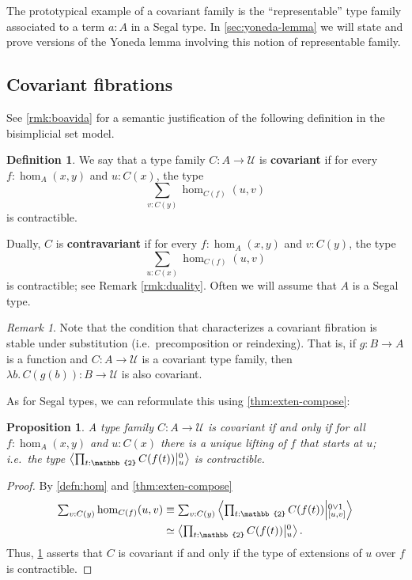 \documentclass{amsart}
\theoremstyle{plain}
\newtheorem{prop}[thm]{Proposition}
\theoremstyle{definition}
\newtheorem{defn}[thm]{Definition}
\theoremstyle{remark}
\newtheorem{rmk}[thm]{Remark}
\numberwithin{equation}{section}
\newcommand{\tsum}{\textstyle\sum}
\newcommand{\exten}[4]{\left\langle\mathchoice{\textstyle\prod_{#1}}{\textstyle\prod_{#1}}{\scriptstyle\prod_{#1}}{\scriptscriptstyle\prod_{#1}} #2 \middle|^{#3}_{#4}\right\rangle}
\newcommand{\jdeq}{\equiv}
\newcommand{\univtype}{\mathcal{U}}
\newcommand{\lam}[1]{\lambda #1.\,}
\newcommand{\two}{\mathbb{2}}
\begin{document}
The prototypical example of a covariant family is the ``representable'' type family associated to a term $a : A$ in a Segal type.
In \cref{sec:yoneda-lemma} we will state and prove versions of the Yoneda lemma involving this notion of representable family.

\subsection{Covariant fibrations}

See \cref{rmk:boavida} for a semantic justification of the following definition in the bisimplicial set model.

\begin{defn}\label{defn:covariant-family}
  We say that a type family $C:A\to\univtype$ is \textbf{covariant} if for every $f:\hom_A(x,y)$ and $u:C(x)$, the type \[\sum_{v:C(y)} \hom_{C(f)}(u,v)\] is contractible.
\end{defn}

Dually, $C$ is \textbf{contravariant} if for every $f:\hom_A(x,y)$ and $v:C(y)$, the type \[\sum_{u:C(x)} \hom_{C(f)}(u,v)\] is contractible; see Remark \ref{rmk:duality}.
Often we will assume that $A$ is a Segal type.

\begin{rmk}\label{rmk:covariant-pullbacks}
Note that the condition that characterizes a covariant fibration is stable under substitution (i.e.\ precomposition or reindexing).
That is, if $g : B \to A$ is a function and  $C : A \to \univtype$ is a covariant type family, then $\lam{b}C(g(b)) : B \to \univtype$ is also covariant.
\end{rmk}

As for Segal types, we can reformulate this using \cref{thm:exten-compose}:

\begin{prop}\label{prop:covariance-as-extension-type} A type family $C : A \to \univtype$ is covariant if and only if for all $f : \hom_A(x,y)$ and $u : C(x)$ there is a unique lifting of $f$ that starts at $u$; {i.e.\ the type 
\(\exten{t:\two}{C(f(t))}{0}{u}\)
is contractible.}
\end{prop}
\begin{proof}
By \cref{defn:hom} and \cref{thm:exten-compose}
\begin{align*}
  \tsum_{v:C(y)} \hom_{C(f)}(u,v)
  &\jdeq \tsum_{v:C(y)} \exten{t:\two}{C(f(t))}{0\lor 1}{[u,v]}\\
  &\simeq \exten{t:\two}{C(f(t))}{0}{u}.
\end{align*}
Thus, \cref{defn:covariant-family} asserts that $C$ is covariant if and only if the type of extensions of $u$ over $f$ is contractible.
\end{proof}
\end{document}
